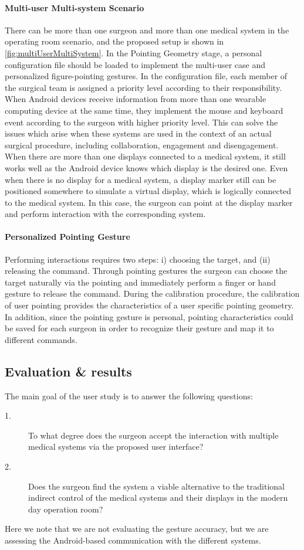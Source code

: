 {\paragraph{Multi-user Multi-system Scenario}
There can be more than one surgeon and more than one medical system in the operating room scenario, and the proposed setup is shown in \figurename{\ref{fig:multiUserMultiSystem}}. In the Pointing Geometry stage, a personal configuration file should be loaded to implement the multi-user case and personalized figure-pointing gestures. In the configuration file, each member of the surgical team is assigned a priority level according to their responsibility. When Android devices receive information from more than one wearable computing device at the same time, they implement the mouse and keyboard event according to the surgeon with higher priority level. This can solve the issues which arise when these systems are used in the context of an actual surgical procedure, including collaboration, engagement and disengagement. When there are more than one displays connected to a medical system, it still works well as the Android device knows which display is the desired one. Even when there is no display for a medical system, a display marker still can be positioned somewhere to simulate a virtual display, which is logically connected to the medical system. In this case, the surgeon can point at the display marker and perform interaction with the corresponding system.

\paragraph{Personalized Pointing Gesture} 
Performing interactions requires two steps: i) choosing the target, and (ii) releasing the command. Through pointing gestures the surgeon can choose the target naturally via the pointing and immediately perform a finger or hand gesture to release the command. During the calibration procedure, the calibration of user pointing provides the characteristics of a user specific pointing geometry. In addition, since the pointing gesture is personal, pointing characteristics could be saved for each surgeon in order to recognize their gesture and map it to different commands.

\subsection{Evaluation \& results}
The main goal of the user study is to answer the following questions: 
\begin{description}
	\item[1.] To what degree does the surgeon accept the interaction with multiple medical systems via the proposed user interface?
	\item[2.] Does the surgeon find the system a viable alternative to the traditional indirect control of the medical systems and their displays in the modern day operation room?
\end{description}
Here we note that we are not evaluating the gesture accuracy, but we are assessing the Android-based communication with the different systems.

}
